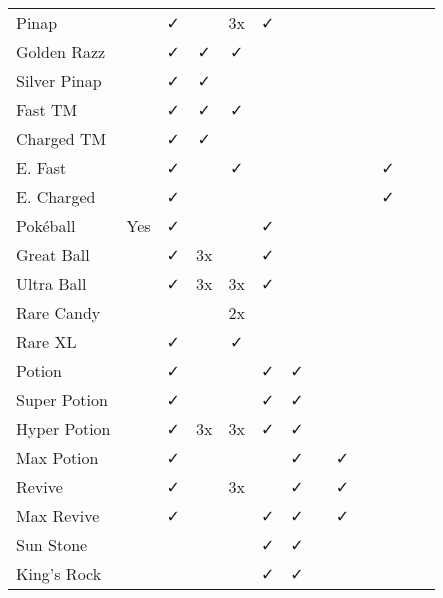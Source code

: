 \documentclass[ebook,10pt,openany,oneside]{memoir}
\begin{document}
\begin{table}
\begin{tabular}{p{}cccccccccccc}
Pinap             &      & ✓ &     & 3x &  ✓ &     &     &     &   &   &   &   \\
Golden Razz       &      & ✓ & ✓   & ✓  &    &     &     &     &   &   &   &   \\
Silver Pinap      &      & ✓ & ✓   &    &    &     &     &     &   &   &   &   \\
Fast TM           &      & ✓ & ✓   & ✓  &    &     &     &     &   &   &   &   \\
Charged TM        &      & ✓ & ✓   &    &    &     &     &     &   &   &   &   \\
E. Fast           &      & ✓ &     & ✓  &    &     &     &     &   & ✓ &   &   \\
E. Charged        &      & ✓ &     &    &    &     &     &     &   & ✓ &   &   \\
Pokéball          & Yes  & ✓ &     &    &  ✓ &     &     &     &   &   &   &   \\
Great Ball        &      & ✓ & 3x  &    &  ✓ &     &     &     &   &   &   &   \\
Ultra Ball        &      & ✓ & 3x  & 3x &  ✓ &     &     &     &   &   &   &   \\
Rare Candy        &      &   &     & 2x &    &     &     &     &   &   &   &   \\
Rare XL           &      & ✓ &     & ✓  &    &     &     &     &   &   &   &   \\
Potion            &      & ✓ &     &    &  ✓ &  ✓  &     &     &   &   &   &   \\
Super Potion      &      & ✓ &     &    &  ✓ &  ✓  &     &     &   &   &   &   \\
Hyper Potion      &      & ✓ & 3x  & 3x &  ✓ &  ✓  &     &     &   &   &   &   \\
Max Potion        &      & ✓ &     &    &    &  ✓  &     & ✓   &   &   &   &   \\
Revive            &      & ✓ &     & 3x &    &  ✓  &     &  ✓  &   &   &   &   \\
Max Revive        &      & ✓ &     &    &  ✓ &  ✓  &     &  ✓  &   &   &   &   \\
Sun Stone         &      &   &     &    &  ✓ &  ✓  &     &     &   &   &   &   \\
King's Rock       &      &   &     &    &  ✓ &  ✓  &     &     &   &   &   &   \\

\end{tabular}
\end{table}
\end{document}
